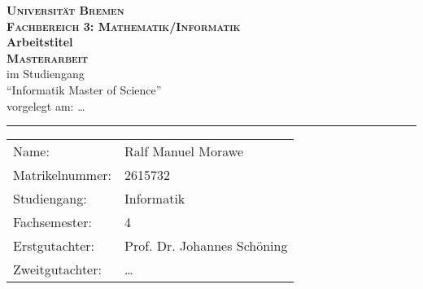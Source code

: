 \begin{titlepage}
	\begin{center}
		\LARGE\textbf{\textsc{Universität Bremen}}\\
		\large\textbf{\textsc{Fachbereich 3: Mathematik/Informatik}}\\
		\vspace{2cm}
		\LARGE \textbf{\textsf{Arbeitstitel}} \\
		\vspace{2cm}
		\LARGE\textbf{\textsc{Masterarbeit}}\\
		\vspace{0.5cm}
		\large
		im Studiengang\\
		\enquote{Informatik Master of Science}\\
		\vspace{1cm}
		\normalsize
		vorgelegt am: \dots \\
		\vspace{3.5cm}
	\end{center}
	\vfill
	\hrule
	\vspace{1em}
	\normalsize{
		\begin{tabular}{ll}
			Name: & {Ralf Manuel Morawe} \\
			Matrikelnummer: & {2615732} \\
			Studiengang: & Informatik\\
			Fachsemester: & 4\\
			Erstgutachter: & {Prof. Dr. Johannes Schöning} \\
			Zweitgutachter: & {\dots} \\
		\end{tabular}\\
	}
\end{titlepage}
\cleardoublepage